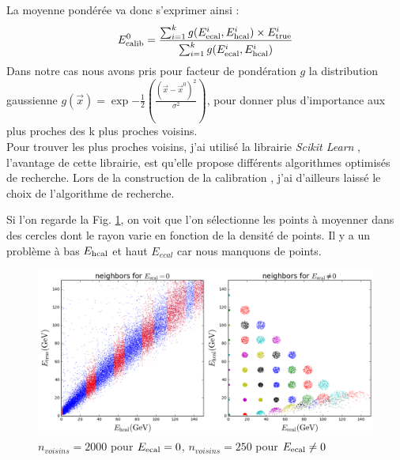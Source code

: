 \documentclass[11pt,a4paper]{article}
\begin{document}
La moyenne pondérée va donc s'exprimer ainsi :
\begin{equation}
	 E_{\rm calib}^0 = \frac{\sum_{i=1}^k g(E_{\rm ecal}^i, E_{\rm hcal}^i) \times E_{\rm true}^i}{\sum_{i=1}^k g(E_{\rm ecal}^i, E_{\rm hcal}^i)}
\end{equation}
Dans notre cas nous avons pris pour facteur de pondération $g$ la distribution gaussienne $g(\vec{x}) = \exp{-\frac{1}{2}(\frac{(\vec{x} - \vec{x}^0)^2}{\sigma^2})}$, pour donner plus d'importance aux plus proches des k plus proches voisins.\\

Pour trouver les plus proches voisins, j'ai utilisé la librairie \textit{Scikit Learn} \cite{scikitKNN}, l'avantage de cette librairie, est qu'elle propose différents algorithmes optimisés de recherche. Lors de la construction de la calibration \cite{GitHubKNN}, j'ai d'ailleurs laissé le choix de l'algorithme de recherche.

Si l'on regarde la Fig.  \ref{neighbors}, on voit que l'on sélectionne les points à moyenner dans des cercles dont le rayon varie en fonction de la densité de points. Il y a un problème à bas $E_{\rm hcal}$ et haut $E_{ecal}$ car nous manquons de points.

\begin{figure}[!h]
	\begin{center}
		\includegraphics[width=\textwidth]{images/pictures/testKNNGF/KNNGaussianFit_neighborhood.png}
		\caption{$n_{voisins} = 2000$ pour $E_{\rm ecal} = 0$, $n_{voisins} = 250$ pour $E_{\rm ecal} \neq 0$}
		\label{neighbors}
		\end{center}
\end{figure}
\end{document}
